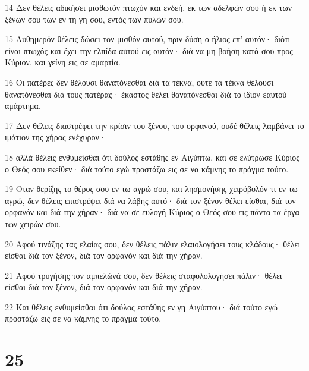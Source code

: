 \par 14 Δεν θέλεις αδικήσει μισθωτόν πτωχόν και ενδεή, εκ των αδελφών σου ή εκ των ξένων σου των εν τη γη σου, εντός των πυλών σου.
\par 15 Αυθημερόν θέλεις δώσει τον μισθόν αυτού, πριν δύση ο ήλιος επ' αυτόν· διότι είναι πτωχός και έχει την ελπίδα αυτού εις αυτόν· διά να μη βοήση κατά σου προς Κύριον, και γείνη εις σε αμαρτία.
\par 16 Οι πατέρες δεν θέλουσι θανατόνεσθαι διά τα τέκνα, ούτε τα τέκνα θέλουσι θανατόνεσθαι διά τους πατέρας· έκαστος θέλει θανατόνεσθαι διά το ίδιον εαυτού αμάρτημα.
\par 17 Δεν θέλεις διαστρέφει την κρίσιν του ξένου, του ορφανού, ουδέ θέλεις λαμβάνει το ιμάτιον της χήρας ενέχυρον·
\par 18 αλλά θέλεις ενθυμείσθαι ότι δούλος εστάθης εν Αιγύπτω, και σε ελύτρωσε Κύριος ο Θεός σου εκείθεν· διά τούτο εγώ προστάζω εις σε να κάμνης το πράγμα τούτο.
\par 19 Όταν θερίζης το θέρος σου εν τω αγρώ σου, και λησμονήσης χειρόβολόν τι εν τω αγρώ, δεν θέλεις επιστρέψει διά να λάβης αυτό· διά τον ξένον θέλει είσθαι, διά τον ορφανόν και διά την χήραν· διά να σε ευλογή Κύριος ο Θεός σου εις πάντα τα έργα των χειρών σου.
\par 20 Αφού τινάξης τας ελαίας σου, δεν θέλεις πάλιν ελαιολογήσει τους κλάδους· θέλει είσθαι διά τον ξένον, διά τον ορφανόν και διά την χήραν.
\par 21 Αφού τρυγήσης τον αμπελώνά σου, δεν θέλεις σταφυλολογήσει πάλιν· θέλει είσθαι διά τον ξένον, διά τον ορφανόν και διά την χήραν.
\par 22 Και θέλεις ενθυμείσθαι ότι δούλος εστάθης εν γη Αιγύπτου· διά τούτο εγώ προστάζω εις σε να κάμνης το πράγμα τούτο.

\chapter{25}

